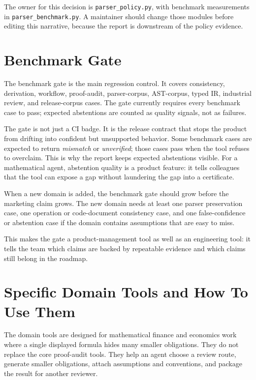 \documentclass[12pt,a4paper,openany]{book}
\begin{document}
The owner for this decision is \texttt{parser\_policy.py}, with benchmark
measurements in \texttt{parser\_benchmark.py}. A maintainer should change those
modules before editing this narrative, because the report is downstream of the
policy evidence.



\chapter{Benchmark Gate}

The benchmark gate is the main regression control. It covers consistency,
derivation, workflow, proof-audit, parser-corpus, AST-corpus, typed IR,
industrial review, and release-corpus cases. The gate currently requires every
benchmark case to pass; expected abstentions are counted as quality signals, not
as failures.

The gate is not just a CI badge. It is the release contract that stops the
product from drifting into confident but unsupported behavior. Some benchmark
cases are expected to return \emph{mismatch} or \emph{unverified}; those cases
pass when the tool refuses to overclaim. This is why the report keeps expected
abstentions visible. For a mathematical agent, abstention quality is a product
feature: it tells colleagues that the tool can expose a gap without laundering
the gap into a certificate.

When a new domain is added, the benchmark gate should grow before the marketing
claim grows. The new domain needs at least one parser preservation case, one
operation or code-document consistency case, and one false-confidence or
abstention case if the domain contains assumptions that are easy to miss.

This makes the gate a product-management tool as well as an engineering tool:
it tells the team which claims are backed by repeatable evidence and which
claims still belong in the roadmap.



\chapter{Specific Domain Tools and How To Use Them}

The domain tools are designed for mathematical finance and economics work where
a single displayed formula hides many smaller obligations. They do not replace
the core proof-audit tools. They help an agent choose a review route, generate
smaller obligations, attach assumptions and conventions, and package the result
for another reviewer.
\end{document}
